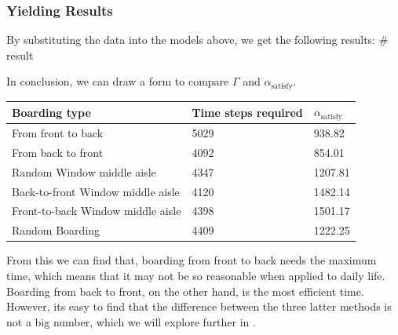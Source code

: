 \documentclass{article}
\theoremstyle{definition}
\theoremstyle{remark}
\numberwithin{equation}{section}
\begin{document}
	\subsubsection{Yielding Results}
	By substituting the data into the models above, we get the following results:
	\# result

	In conclusion, we can draw a form to compare $\Gamma$ and $\alpha_\text{satisfy}$.

	\begin{center}
	\begin{tabular}{||l|l|l||}
		\hline
		Boarding type&Time steps required&$\alpha_\text{satisfy}$\\
		\hline
		From front to back&5029&938.82\\
		From back to front&4092&854.01\\
		Random Window middle aisle&4347&1207.81\\
		Back-to-front Window middle aisle&4120&1482.14\\
		Front-to-back Window middle aisle&4398&1501.17\\
		Random Boarding&4409&1222.25\\
		\hline
	\end{tabular}
	\end{center}
	From this we can find that, boarding from front to back needs the maximum time, which means that it may not be so reasonable when applied to daily life. Boarding from back to front, on the other hand, is the most  efficient time. However, its easy to find that the difference between the three latter methods is not a big number, which we will explore further in .
\end{document}

